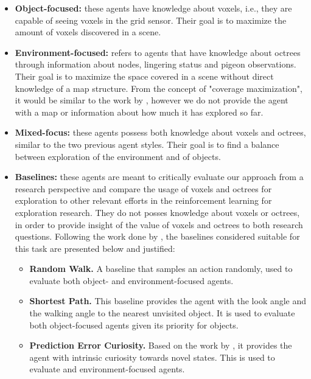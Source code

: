 \begin{itemize}
    \item \textbf{Object-focused:} these agents have knowledge about voxels, i.e., they are capable of seeing voxels in the grid sensor. Their goal is to maximize the amount of voxels discovered in a scene.
    \item \textbf{Environment-focused:} refers to agents that have knowledge about octrees through information about nodes, lingering status and pigeon observations. Their goal is to maximize the space covered in a scene without direct knowledge of a map structure. From the concept of "coverage maximization", it would be similar to the work by \textcite{chen2019learning}, however we do not provide the agent with a map or information about how much it has explored so far.
    \item \textbf{Mixed-focus: }these agents possess both knowledge about voxels and octrees, similar to the two previous agent styles. Their goal is to find a balance between exploration of the environment and of objects.
    \item \textbf{Baselines:} these agents are meant to critically evaluate our approach from a research perspective and compare the usage of voxels and octrees for exploration to other relevant efforts in the reinforcement learning for exploration research. They do not posses knowledge about voxels or octrees, in order to provide insight of the value of voxels and octrees to both research questions.
    Following the work done by \textcite{chaplot2020semantic}, the baselines considered suitable for this task are presented below and justified:
        \begin{itemize}
        \item \textbf{Random Walk.} A baseline that samples an action randomly, used to evaluate both object- and environment-focused agents.
        \item \textbf{Shortest Path.} This baseline provides the agent with the look angle and the walking angle to the nearest unvisited object. It is used to evaluate both object-focused agents given its priority for objects. %
        \item \textbf{Prediction Error Curiosity.} Based on the work by \textcite{pathak2017curiosity}, it provides the agent with intrinsic curiosity towards novel states. This is used to evaluate and environment-focused agents.

\end{itemize}
\end{itemize}
